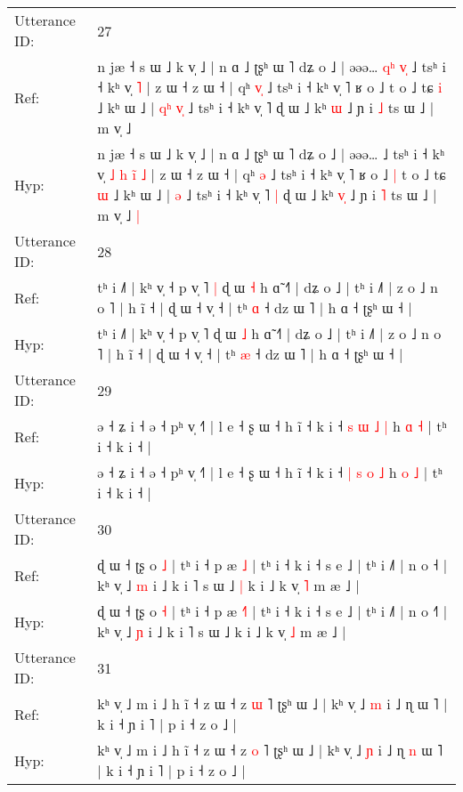 \documentclass[10pt]{article}
\DeclareRobustCommand{\hl}[1]{{\textcolor{red}{#1}}}
\begin{document}
\begin{longtable}{ll}
 \\
\midrule
Utterance ID: & 27 \\
Ref: & n jæ ˧ s ɯ ˩ k v̩ ˩ | n ɑ ˩ ʈʂʰ ɯ ˥ dʑ o ˩ | əəə…\hl{ }\hl{q}\hl{ʰ}\hl{ }\hl{v}\hl{̩} ˩ tsʰ i ˧ kʰ v̩\hl{}\hl{}\hl{}\hl{}\hl{}\hl{}\hl{} \hl{˥} | z ɯ ˧ z ɯ ˧ | qʰ \hl{v}\hl{̩} ˩ tsʰ i ˧ kʰ v̩ ˥ ʁ o ˩\hl{}\hl{} t o ˩ tɕ \hl{i} ˩ kʰ ɯ ˩ |\hl{ }\hl{q}\hl{ʰ} \hl{v}\hl{̩} ˩ tsʰ i ˧ kʰ v̩ ˥\hl{}\hl{} ɖ ɯ ˩ kʰ \hl{}\hl{ɯ} ˩ ɲ i \hl{˩} ts ɯ ˩ | m v̩ ˩\hl{}\hl{}
 \\
Hyp: & n jæ ˧ s ɯ ˩ k v̩ ˩ | n ɑ ˩ ʈʂʰ ɯ ˥ dʑ o ˩ | əəə…\hl{}\hl{}\hl{}\hl{}\hl{}\hl{} ˩ tsʰ i ˧ kʰ v̩\hl{ }\hl{˩}\hl{ }\hl{h}\hl{ }\hl{i}\hl{̃} \hl{˩} | z ɯ ˧ z ɯ ˧ | qʰ \hl{}\hl{ə} ˩ tsʰ i ˧ kʰ v̩ ˥ ʁ o ˩\hl{ }\hl{|} t o ˩ tɕ \hl{ɯ} ˩ kʰ ɯ ˩ |\hl{}\hl{}\hl{} \hl{}\hl{ə} ˩ tsʰ i ˧ kʰ v̩ ˥\hl{ }\hl{|} ɖ ɯ ˩ kʰ \hl{v}\hl{̩} ˩ ɲ i \hl{˥} ts ɯ ˩ | m v̩ ˩\hl{ }\hl{|}
 \\
\midrule
Utterance ID: & 28 \\
Ref: & tʰ i ˩˥ | kʰ v̩ ˧ p v̩ ˥\hl{ }\hl{|} ɖ ɯ \hl{˧} h ɑ̃ ˧˥ | dʑ o ˩ | tʰ i ˩˥ | z o ˩ n o ˥ | h ĩ ˧ | ɖ ɯ ˧ v̩ ˧ | tʰ \hl{ɑ} ˧ dz ɯ ˥ | h ɑ ˧ ʈʂʰ ɯ ˧ |
 \\
Hyp: & tʰ i ˩˥ | kʰ v̩ ˧ p v̩ ˥\hl{}\hl{} ɖ ɯ \hl{˩} h ɑ̃ ˧˥ | dʑ o ˩ | tʰ i ˩˥ | z o ˩ n o ˥ | h ĩ ˧ | ɖ ɯ ˧ v̩ ˧ | tʰ \hl{æ} ˧ dz ɯ ˥ | h ɑ ˧ ʈʂʰ ɯ ˧ |
 \\
\midrule
Utterance ID: & 29 \\
Ref: & ə ˧ ʑ i ˧ ə ˧ pʰ v̩ ˧˥ | l e ˧ ʂ ɯ ˧ h ĩ ˧ k i ˧ \hl{s} \hl{ɯ} \hl{˩} \hl{|} h \hl{ɑ} \hl{˧} | tʰ i ˧ k i ˧ |
 \\
Hyp: & ə ˧ ʑ i ˧ ə ˧ pʰ v̩ ˧˥ | l e ˧ ʂ ɯ ˧ h ĩ ˧ k i ˧ \hl{|} \hl{s} \hl{o} \hl{˩} h \hl{o} \hl{˩} | tʰ i ˧ k i ˧ |
 \\
\midrule
Utterance ID: & 30 \\
Ref: & ɖ ɯ ˧ ʈʂ o \hl{˩} | tʰ i ˧ p æ \hl{}\hl{˩} | tʰ i ˧ k i ˧ s e ˩ | tʰ i ˩˥ | n o ˧\hl{} | kʰ v̩ ˩ \hl{m} i ˩ k i ˥ s ɯ ˩\hl{ }\hl{|} k i ˩ k v̩ \hl{˥} m æ ˩ |
 \\
Hyp: & ɖ ɯ ˧ ʈʂ o \hl{˧} | tʰ i ˧ p æ \hl{˧}\hl{˥} | tʰ i ˧ k i ˧ s e ˩ | tʰ i ˩˥ | n o ˧\hl{˥} | kʰ v̩ ˩ \hl{ɲ} i ˩ k i ˥ s ɯ ˩\hl{}\hl{} k i ˩ k v̩ \hl{˩} m æ ˩ |
 \\
\midrule
Utterance ID: & 31 \\
Ref: & kʰ v̩ ˩ m i ˩ h ĩ ˧ z ɯ ˧ z \hl{ɯ} ˥ ʈʂʰ ɯ ˩ | kʰ v̩ ˩ \hl{m} i ˩ ɳ\hl{}\hl{} ɯ ˥ | k i ˧ ɲ i ˥ | p i ˧ z o ˩ |
 \\
Hyp: & kʰ v̩ ˩ m i ˩ h ĩ ˧ z ɯ ˧ z \hl{o} ˥ ʈʂʰ ɯ ˩ | kʰ v̩ ˩ \hl{ɲ} i ˩ ɳ\hl{ }\hl{n} ɯ ˥ | k i ˧ ɲ i ˥ | p i ˧ z o ˩ |

\end{longtable}
\end{document}
